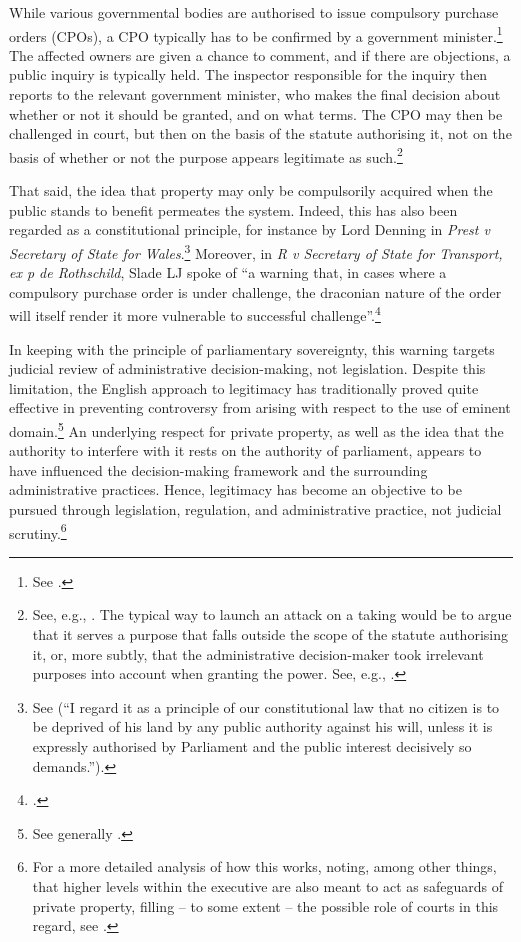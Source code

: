 While various governmental bodies are authorised to issue compulsory purchase orders (CPOs), a CPO typically has to be confirmed by a government minister.\footnote{See \cite[48]{waring09}.} The affected owners are given a chance to comment, and if there are objections, a public inquiry is typically held. The inspector responsible for the inquiry then reports to the relevant government minister, who makes the final decision about whether or not it should be granted, and on what terms. The CPO may then be challenged in court, but then on the basis of the statute authorising it, not on the basis of whether or not the purpose appears legitimate as such.\footnote{See, e.g., \cite[48-49]{waring09}. The typical way to launch an attack on a taking would be to argue that it serves a purpose that falls outside the scope of the statute authorising it, or, more subtly, that the administrative decision-maker took irrelevant purposes into account when granting the power. See, e.g., \cite{sainsbury10}.} 

That said, the idea that property may only be compulsorily acquired when the public stands to benefit permeates the system. Indeed, this has also been regarded as a constitutional principle, for instance by Lord Denning in {\it Prest v Secretary of State for Wales}.\footnote{See \cite[198]{prest82} (``I regard it as a principle of our constitutional law that no citizen is to be deprived of his land by any public authority against his will, unless it is expressly authorised by Parliament and the public interest decisively so demands.'').} Moreover, in {\it R v Secretary of State for Transport, ex p de Rothschild}, Slade LJ spoke of ``a warning that, in cases where a compulsory purchase order is under challenge, the draconian nature of the order will itself render it more vulnerable to successful challenge''.\footcite[938]{rothschild89}

In keeping with the principle of parliamentary sovereignty, this warning targets judicial review of administrative decision-making, not legislation. Despite this limitation, the English approach to legitimacy has traditionally proved quite effective in preventing controversy from arising with respect to the use of eminent domain.\footnote{See generally \cite{allen10}.} An underlying respect for private property, as well as the idea that the authority to interfere with it rests on the authority of parliament, appears to have influenced the decision-making framework and the surrounding administrative practices. Hence, legitimacy has become an objective to be pursued through legislation, regulation, and administrative practice, not judicial scrutiny.\footnote{For a more detailed analysis of how this works, noting, among other things, that higher levels within the executive are also meant to act as safeguards of private property, filling -- to some extent -- the possible role of courts in this regard, see \cite[85-100]{allen08}.}

